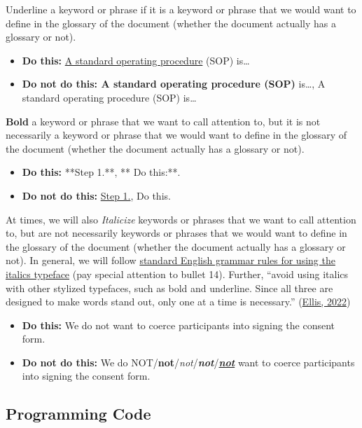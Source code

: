 \documentclass[
  letterpaper,
  DIV=11,
  numbers=noendperiod]{scrreprt}
\providecommand{\tightlist}{%
  \setlength{\itemsep}{0pt}\setlength{\parskip}{0pt}}\usepackage{longtable,booktabs,array}
\begin{document}
Underline a keyword or phrase if it is a keyword or phrase that we would
want to define in the glossary of the document (whether the document
actually has a glossary or not).

\begin{itemize}
\tightlist
\item
  \textbf{Do this:} \ul{A standard operating procedure} (SOP) is\ldots{}
\item
  \textbf{Do not do this: A standard operating procedure (SOP)}
  is\ldots, A standard operating procedure (SOP) is\ldots{}
\end{itemize}

\textbf{Bold} a keyword or phrase that we want to call attention to, but
it is not necessarily a keyword or phrase that we would want to define
in the glossary of the document (whether the document actually has a
glossary or not).

\begin{itemize}
\tightlist
\item
  \textbf{Do this:} **Step 1.**, ** Do this:**.
\item
  \textbf{Do not do this:} \ul{Step 1.}, Do this.
\end{itemize}

At times, we will also \emph{Italicize} keywords or phrases that we want
to call attention to, but are not necessarily keywords or phrases that
we would want to define in the glossary of the document (whether the
document actually has a glossary or not). In general, we will follow
\href{https://www.grammarly.com/blog/italics/}{standard English grammar
rules for using the italics typeface} (pay special attention to bullet
14). Further, ``avoid using italics with other stylized typefaces, such
as bold and underline. Since all three are designed to make words stand
out, only one at a time is necessary.''
(\href{https://www.grammarly.com/blog/italics/}{Ellis, 2022})

\begin{itemize}
\tightlist
\item
  \textbf{Do this:} We do not want to coerce participants into signing
  the consent form.
\item
  \textbf{Do not do this:} We do
  NOT/\textbf{not}/\emph{not}/\textbf{\emph{not}}/\ul{\textbf{\emph{not}}}
  want to coerce participants into signing the consent form.
\end{itemize}

\subsection{Programming Code}\label{programming-code}
\end{document}
